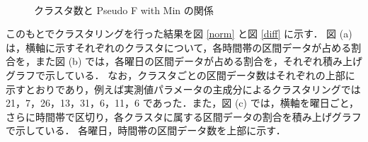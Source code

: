 \documentclass[technicalreport]{ieicej}
\begin{document}
\begin{figure}[tb]
\begin{center}
~
\caption{クラスタ数と Pseudo F with Min の関係}
\label{PseudoFwithMinPlot}
\end{center}
\end{figure}

このもとでクラスタリングを行った結果を図 \ref{norm} と図 \ref{diff} に示す．
図 (a) は，横軸に示すそれぞれのクラスタについて，各時間帯の区間データが占める割合を，また図 (b) では，各曜日の区間データが占める割合を，それぞれ積み上げグラフで示している．
なお，クラスタごとの区間データ数はそれぞれの上部に示すとおりであり，例えば実測値パラメータの主成分によるクラスタリングでは 21，7，26，13，31，6，11，6 であった．また，図 (c) では，横軸を曜日ごと，さらに時間帯で区切り，各クラスタに属する区間データの割合を積み上げグラフで示している．
各曜日，時間帯の区間データ数を上部に示す．
\end{document}
